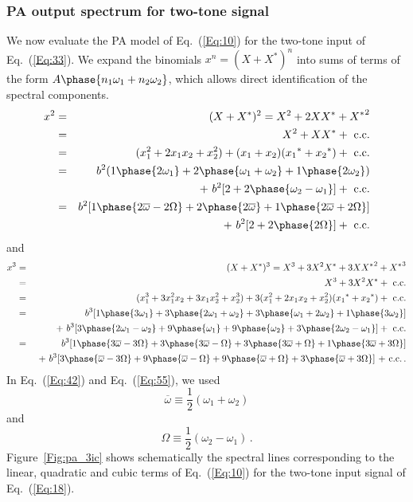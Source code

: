 \documentclass[11pt,oneside,a4paper]{scrartcl}
\newcommand{\Eq}[1]{Eq.~(\ref{Eq:#1})}
\newcommand{\Figure}[1]{Figure~\ref{Fig:#1}}
\newcommand{\cc}[1]{\ensuremath{{#1}^*}}
\newcommand{\ave}[1]{\ensuremath{\overline{#1}}}
\begin{document}
\subsubsection*{PA output spectrum for two-tone signal}
We now evaluate the PA model of \Eq{10} for the two-tone input of \Eq{33}. We expand the  binomials $x^n = (X+\cc{X})^n$ into sums of terms of the form $A\phase{n_1\omega_1+n_2\omega_2}$, which allows direct identification of the spectral components. 
\begin{eqnarray}
	x^2 &=& (X+\cc X)^2 = X^2 + 2 X \cc{X} + {\cc{X}}^2  \nonumber \\
		&=& X^2 + X \cc{X} + \mbox{ c.c.}  \nonumber \\
		&=& ( x_1^2 + 2 x_1x_2 + x_2^2) 
				+ (x_1+x_2)(\cc{x_1} + \cc{x_2}) + \mbox{ c.c.}  \nonumber \\
		&=& b^2 ( 1\phase{2\omega_1} 
				+ 2\phase{\omega_1+\omega_2} 
					+ 1\phase{2\omega_2} \nonumber )\\
		& &  + \,\, b^2 [ 2 + 2\phase{\omega_2-\omega_1}]
					+ \mbox{ c.c.} \label{Eq:40} \\
		&=& b^2 [ 
				1\phase{2\ave{\omega}-2\Omega} 
				+ 2\phase{2\ave{\omega}} 
				+ 1\phase{2\ave{\omega}+2\Omega} 
					\nonumber]\\
		& &  + \,\, b^2 [ 2 + 2\phase{2\Omega}]
					+ \mbox{ c.c.} \label{Eq:42} 
\end{eqnarray}
and 
\begin{eqnarray}
	x^3 &=& (X+\cc X)^3 = X^3 + 3 X^2 \cc{X} + 3 X {\cc{X}}^2 + {\cc{X}}^3 \nonumber \\
		&=& X^3 + 3 X^2 \cc{X} + \mbox{ c.c.} \nonumber \\
		&=& ( x_1^3 + 3 x_1^2 x_2 + 3 x_1 x_2^2 + x_2^3)
			+ 3( x_1^2 + 2 x_1x_2 + x_2^2) ( \cc{x_1} + \cc{x_2}) 
								+ \mbox{ c.c.}  \nonumber \\
		&=& b^3 [ 1\phase{3\omega_1} 
				+ 3\phase{2\omega_1+\omega_2} 
					+ 3\phase{\omega_1 + 2\omega_2} 
						+ 1\phase{3\omega_2} \nonumber ]\\
		& &  \,\, + \,\, b^3 [ 
							3\phase{2\omega_1-\omega_2} 					
							+ 9\phase{\omega_1} 
							+ 9\phase{\omega_2} 
							+ 3\phase{2\omega_2-\omega_1}
							] 
							+ \mbox{ c.c.} \label{Eq:50} \\
		&=& b^3 [ 1\phase{3\overline{\omega}-3\Omega} 
				+ 3\phase{3\overline{\omega}-\Omega} 
				+ 3\phase{3\overline{\omega}+\Omega} 
				+ 1\phase{3\overline{\omega}+3\Omega}] \nonumber \\
		& &  \,\, + \,\, b^3 [ 3\phase{\overline{\omega}-3\Omega} 
		   						+ 9\phase{\overline{\omega}-\Omega}
		   						+ 9\phase{\overline{\omega}+\Omega}
								+ 3\phase{\overline{\omega}+3\Omega} ]
									 \mbox{ + c.c.} \label{Eq:55} \,.
\end{eqnarray}
In \Eq{42} and \Eq{55}, we used
\[
	\overline{\omega} \equiv \frac 1 2 (\omega_1 + \omega_2)
\]
and
\[
	\Omega \equiv \frac 1 2 (\omega_2 - \omega_1)	\,.
\]
\Figure{pa_3ic} shows schematically the spectral lines corresponding to the linear, quadratic and cubic terms of \Eq{10} for the two-tone input signal of \Eq{18}. 
\end{document}
